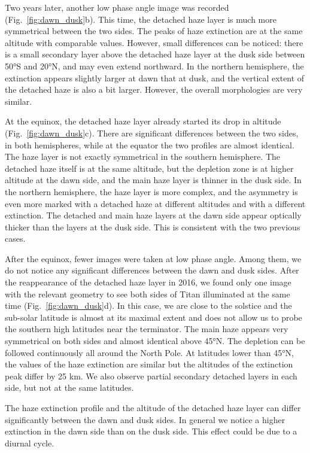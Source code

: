 Two years later, another low phase angle image was recorded (Fig.~\ref{fig:dawn_dusk}b).
This time, the detached haze layer is much more symmetrical between the two sides. The peaks of haze extinction
are at the same altitude with comparable values. However, small differences can be noticed: there is a
small secondary layer above the detached haze layer at the dusk side between \ang{50}S and \ang{20}N, and may even extend
northward. In the northern hemisphere, the extinction appears slightly larger at dawn that at dusk, and the
vertical extent of the detached haze is also a bit larger. However, the overall morphologies are very similar.

At the equinox, the detached haze layer already started its drop in altitude (Fig.~\ref{fig:dawn_dusk}c).
There are significant differences between the two sides, in both hemispheres, while at the equator the two
profiles are almost identical. The haze layer is not exactly symmetrical in the southern hemisphere. The detached
haze itself is at the same altitude, but the depletion zone is at higher altitude at the dawn side, and the main
haze layer is thinner in the dusk side. In the northern hemisphere, the haze layer is more complex, and the
asymmetry is even more marked with a detached haze at different altitudes and with a different extinction. The
detached and main haze layers at the dawn side appear optically thicker than the layers at the dusk side.
This is consistent with the two previous cases.

After the equinox, fewer images were taken at low phase angle. Among them, we do not notice any
significant differences between the dawn and dusk sides. After the reappearance of the detached haze layer in
2016, we found only one image with the relevant geometry to see both sides of Titan illuminated at the same time
(Fig.~\ref{fig:dawn_dusk}d). In this case, we are close to the solstice and the sub-solar latitude is almost
at its maximal extent and does not allow us to probe the southern high latitudes near the terminator.
The main haze appears very symmetrical on both sides and almost identical
above \ang{45}N. The depletion can be followed continuously all around the North Pole. At latitudes lower than
\ang{45}N, the values of the haze extinction are similar but the altitudes of the extinction peak differ by
25 km. We also observe partial secondary detached layers in each side, but not at the same latitudes.

The haze extinction profile and the altitude of the detached haze layer can differ significantly between the dawn
and dusk sides. In general we notice a higher extinction in the dawn side than on the dusk side. This effect
could be due to a diurnal cycle.